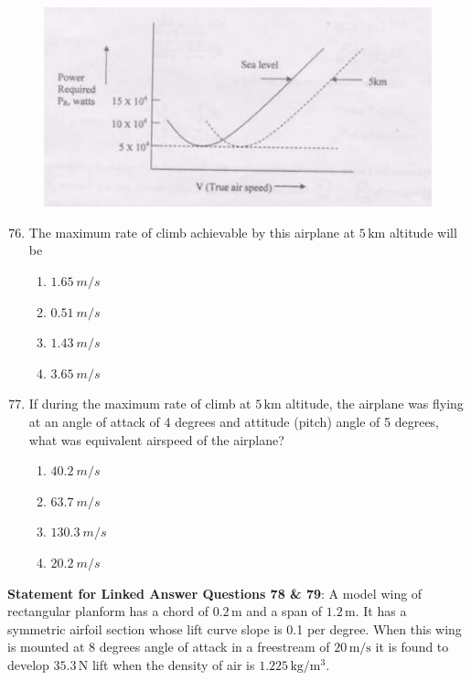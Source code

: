 \documentclass{article}
\begin{document}
\begin{figure}[H]
    \centering
    \includegraphics[width=0.5\columnwidth]{figs/q76 77.png}
    \caption*{}
    \label{fig:q76 77}
\end{figure}

\begin{enumerate}
    \setcounter{enumi}{75}
    \item The maximum rate of climb achievable by this airplane at $5 \, \mathrm{km}$ altitude will be
    \begin{multicols}{4}
    \begin{enumerate}
        \item $1.65\ m/s$
        \item $0.51\ m/s$
        \item $1.43\ m/s$
        \item $3.65\ m/s$
    \end{enumerate}
    \end{multicols}
    

    \item If during the maximum rate of climb at $5 \, \mathrm{km}$ altitude, the airplane was flying at an angle of attack of 4 degrees and attitude (pitch) angle of 5 degrees, what was equivalent airspeed of the airplane?
    \begin{multicols}{4}
    \begin{enumerate}
        \item $40.2\ m/s$
        \item $63.7\ m/s$
        \item $130.3\ m/s$
        \item $20.2\ m/s$
    \end{enumerate}
    \end{multicols}
    
\end{enumerate}

\textbf{Statement for Linked Answer Questions 78 \& 79}: A model wing of rectangular planform has a chord of $0.2 \, \mathrm{m}$ and a span of $1.2 \, \mathrm{m}$. It has a symmetric airfoil section whose lift curve slope is 0.1 per degree. When this wing is mounted at 8 degrees angle of attack in a freestream of $20 \, \mathrm{m/s}$ it is found to develop $35.3 \, \mathrm{N}$ lift when the density of air is $1.225 \, \mathrm{kg/m^3}$.
\end{document}
